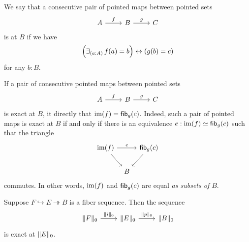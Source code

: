 \begin{defn}
We say that a consecutive pair of pointed maps between pointed sets
\begin{equation*}
\begin{tikzcd}
A \arrow[r,"f"] & B \arrow[r,"g"] & C
\end{tikzcd}
\end{equation*}
is  at $B$ if we have
\begin{equation*}
\Big(\exis{a:A}f(a)=b\Big)\leftrightarrow (g(b)=c)
\end{equation*}
for any $b:B$. 
\end{defn}

\begin{rmk}
If a pair of consecutive pointed maps between pointed sets
\begin{equation*}
\begin{tikzcd}
A \arrow[r,"f"] & B \arrow[r,"g"] & C
\end{tikzcd}
\end{equation*}
is exact at $B$, it directly that $\im(f)=\fib{g}{c}$. Indeed, such a pair of pointed maps is exact at $B$ if and only if there is an equivalence $e:\im(f)\eqvsym \fib{g}{c}$ such that the triangle
\begin{equation*}
\begin{tikzcd}[column sep=tiny]
\im(f) \arrow[dr] \arrow[rr,"e"] & & \fib{g}{c} \arrow[dl] \\
& B
\end{tikzcd}
\end{equation*}
commutes. In other words, $\im(f)$ and $\fib{g}{c}$ are equal \emph{as subsets of $B$}.
\end{rmk}

\begin{lem}
Suppose $F\hookrightarrow E \twoheadrightarrow B$ is a fiber sequence. Then the sequence
\begin{equation*}
\begin{tikzcd}
\trunc{0}{F} \arrow[r,"\trunc{0}{i}"] & \trunc{0}{E} \arrow[r,"\trunc{0}{p}"] & \trunc{0}{B}
\end{tikzcd}
\end{equation*}
is exact at $\trunc{0}{E}$. 
\end{lem}

